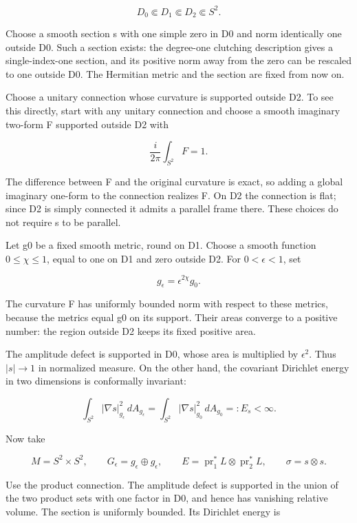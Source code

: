 \[
 D_0\Subset D_1\Subset D_2\Subset S^2.
\]

Choose a smooth section s with one simple zero in D0 and norm identically one outside D0. Such a section exists: the degree-one clutching description gives a single-index-one section, and its positive norm away from the zero can be rescaled to one outside D0. The Hermitian metric and the section are fixed from now on.

Choose a unitary connection whose curvature is supported outside D2. To see this directly, start with any unitary connection and choose a smooth imaginary two-form F supported outside D2 with

\[
 \frac{i}{2\pi}\int_{S^2}F=1.
\]

The difference between F and the original curvature is exact, so adding a global imaginary one-form to the connection realizes F. On D2 the connection is flat; since D2 is simply connected it admits a parallel frame there. These choices do not require s to be parallel.

Let g0 be a fixed smooth metric, round on D1. Choose a smooth function \(0\le\chi\le1\), equal to one on D1 and zero outside D2. For \(0<\epsilon<1\), set

\[
 g_\epsilon=\epsilon^{2\chi}g_0.
\tag{\thesection.2}\label{proof:web-line-limitation:e2}
\]

The curvature F has uniformly bounded norm with respect to these metrics, because the metrics equal g0 on its support. Their areas converge to a positive number: the region outside D2 keeps its fixed positive area.

The amplitude defect is supported in D0, whose area is multiplied by \(\epsilon^2\). Thus \(|s|\to1\) in normalized measure. On the other hand, the covariant Dirichlet energy in two dimensions is conformally invariant:

\[
 \int_{S^2}|\nabla s|_{g_\epsilon}^2\,dA_{g_\epsilon}
 =\int_{S^2}|\nabla s|_{g_0}^2\,dA_{g_0}=:E_s<\infty.
\tag{\thesection.3}\label{proof:web-line-limitation:e3}
\]

Now take

\[
 M=S^2\times S^2,
 \qquad G_\epsilon=g_\epsilon\oplus g_\epsilon,
 \qquad E=\operatorname{pr}_1^*L\otimes\operatorname{pr}_2^*L,
 \qquad \sigma=s\otimes s.
\]

Use the product connection. The amplitude defect is supported in the union of the two product sets with one factor in D0, and hence has vanishing relative volume. The section is uniformly bounded. Its Dirichlet energy is

